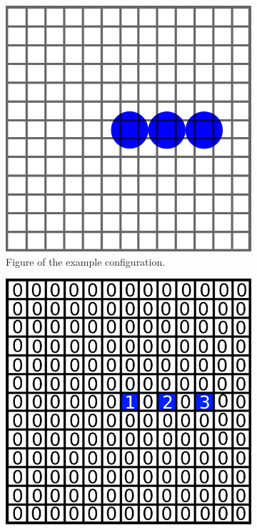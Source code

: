 \begin{figure}[h]
	\begin{center}
		\begin{subfigure}[t]{0.3\textwidth}
			\includegraphics[width = \textwidth]{fig/A_sketch.png}
			\caption{Figure of the example configuration.}
			\label{fig:A_sketch}
		\end{subfigure}
		\begin{subfigure}[t]{0.3\textwidth}
			\includegraphics[width = \textwidth]{fig/B_array.png}

\end{subfigure}
\end{center}
\end{figure}
